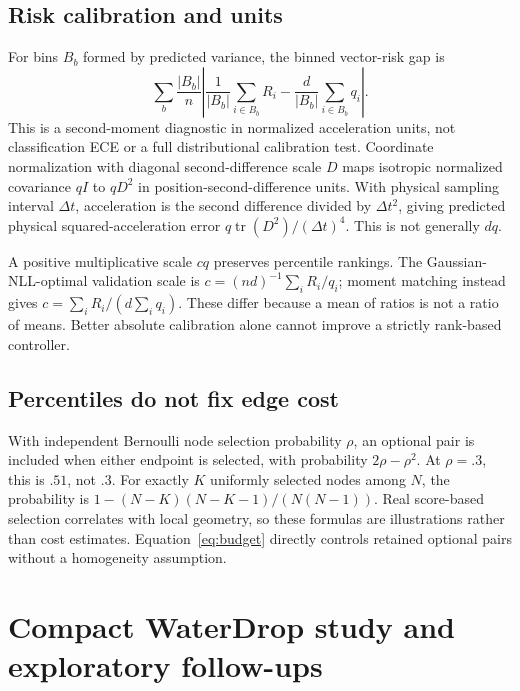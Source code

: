 \subsection{Risk calibration and units}
For bins $B_b$ formed by predicted variance, the binned vector-risk gap is
\begin{equation}
 \sum_b\frac{|B_b|}{n}\left|
 \frac{1}{|B_b|}\sum_{i\in B_b}R_i
 -\frac{d}{|B_b|}\sum_{i\in B_b}q_i\right|.
\end{equation}
This is a second-moment diagnostic in normalized acceleration units, not classification ECE or a full distributional calibration test. Coordinate normalization with diagonal second-difference scale $D$ maps isotropic normalized covariance $qI$ to $qD^2$ in position-second-difference units. With physical sampling interval $\Delta t$, acceleration is the second difference divided by $\Delta t^2$, giving predicted physical squared-acceleration error $q\operatorname{tr}(D^2)/(\Delta t)^4$. This is not generally $dq$.

A positive multiplicative scale $cq$ preserves percentile rankings. The Gaussian-NLL-optimal validation scale is $c=(nd)^{-1}\sum_iR_i/q_i$; moment matching instead gives $c=\sum_iR_i/(d\sum_iq_i)$. These differ because a mean of ratios is not a ratio of means. Better absolute calibration alone cannot improve a strictly rank-based controller.

\subsection{Percentiles do not fix edge cost}
With independent Bernoulli node selection probability $\rho$, an optional pair is included when either endpoint is selected, with probability $2\rho-\rho^2$. At $\rho=.3$, this is $.51$, not $.3$. For exactly $K$ uniformly selected nodes among $N$, the probability is $1-(N-K)(N-K-1)/(N(N-1))$. Real score-based selection correlates with local geometry, so these formulas are illustrations rather than cost estimates. Equation~\ref{eq:budget} directly controls retained optional pairs without a homogeneity assumption.



\section{Compact WaterDrop study and exploratory follow-ups}
\label{sec:compact-study}

